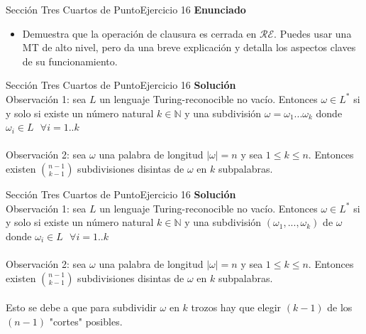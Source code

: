 \documentclass[10pt, envcountsect, presentation, aspectratio=169]{beamer}
\newcommand{\lr}{\ensuremath{\mathcal {RE}}}
\begin{document}
\begin{frame}{Sección Tres Cuartos de Punto}{Ejercicio 16}
    \textbf{Enunciado}
    \begin{itemize}
        \item Demuestra que la operación de clausura es cerrada en $\lr$. Puedes usar una MT de alto nivel, pero da una breve explicación y detalla los aspectos claves de su funcionamiento.
    \end{itemize}
\end{frame}


\begin{frame}{Sección Tres Cuartos de Punto}{Ejercicio 16}
    \textbf{Solución}\\
    Observación 1: sea $L$ un lenguaje Turing-reconocible no vacío. 
    Entonces $\omega \in L^*$ si y solo si existe un número natural $k \in \mathbb{N}$ y una subdivisión $\omega = \omega_1...\omega_k$ donde $\omega_i \in L \text{ } \forall i = 1..k$\\~\\

    Observación 2: sea $\omega$ una palabra de longitud $|\omega|=n$ y sea $1 \leq k \leq n$.
    Entonces existen ${n-1}\choose{k-1}$ subdivisiones disintas de $\omega$ en $k$ subpalabras.
\end{frame}


\begin{frame}{Sección Tres Cuartos de Punto}{Ejercicio 16}
    \textbf{Solución}\\
    Observación 1: sea $L$ un lenguaje Turing-reconocible no vacío. 
    Entonces $\omega \in L^*$ si y solo si existe un número natural $k \in \mathbb{N}$ y una subdivisión $(\omega_1,...,\omega_k)$ de $\omega$ donde $\omega_i \in L \text{ } \forall i = 1..k$\\~\\

    Observación 2: sea $\omega$ una palabra de longitud $|\omega|=n$ y sea $1 \leq k \leq n$.
    Entonces existen ${n-1}\choose{k-1}$ subdivisiones disintas de $\omega$ en $k$ subpalabras.\\~\\

    Esto se debe a que para subdividir $\omega$ en $k$ trozos hay que elegir $(k-1)$ de los $(n-1)$ "cortes" posibles.
\end{frame}
\end{document}
